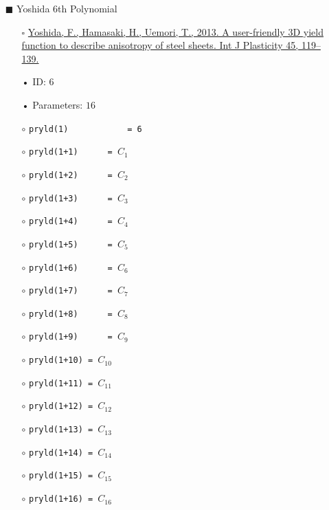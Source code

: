 \documentclass[11pt,a4paper,twoside,final,onecolumn,titlepage]{article}
\begin{document}
\newpage
\begin{itemize}
	\item[\tiny$\blacksquare$] Yoshida 6th Polynomial
	\begin{itemize}
		\item[\tiny$\square$] {\small \href{https://doi.org/10.1016/j.ijplas.2013.01.010}{Yoshida, F., Hamasaki, H., Uemori, T., 2013. A user-friendly 3D yield function to describe anisotropy of steel sheets. Int J Plasticity 45, 119–139.}}\\
		\item[•] ID: $6$
		\item[•] Parameters: $16$\\
		\item[$\circ$] \texttt{pryld(1)\,\,\,\,\,\,\,\,\,\,\,\,= 6}
		\item[$\circ$] \texttt{pryld(1+1)\,\,\,\,\,\,= $C_1$}
		\item[$\circ$] \texttt{pryld(1+2)\,\,\,\,\,\,= $C_2$}
		\item[$\circ$] \texttt{pryld(1+3)\,\,\,\,\,\,= $C_3$}
		\item[$\circ$] \texttt{pryld(1+4)\,\,\,\,\,\,= $C_4$}
		\item[$\circ$] \texttt{pryld(1+5)\,\,\,\,\,\,= $C_5$}
		\item[$\circ$] \texttt{pryld(1+6)\,\,\,\,\,\,= $C_6$}
		\item[$\circ$] \texttt{pryld(1+7)\,\,\,\,\,\,= $C_7$}
		\item[$\circ$] \texttt{pryld(1+8)\,\,\,\,\,\,= $C_8$}
		\item[$\circ$] \texttt{pryld(1+9)\,\,\,\,\,\,= $C_9$}
		\item[$\circ$] \texttt{pryld(1+10) = $C_{10}$}
		\item[$\circ$] \texttt{pryld(1+11) = $C_{11}$}
		\item[$\circ$] \texttt{pryld(1+12) = $C_{12}$}
		\item[$\circ$] \texttt{pryld(1+13) = $C_{13}$}
		\item[$\circ$] \texttt{pryld(1+14) = $C_{14}$}
		\item[$\circ$] \texttt{pryld(1+15) = $C_{15}$}
		\item[$\circ$] \texttt{pryld(1+16) = $C_{16}$}\\
	\end{itemize}
\end{itemize}
\end{document}
